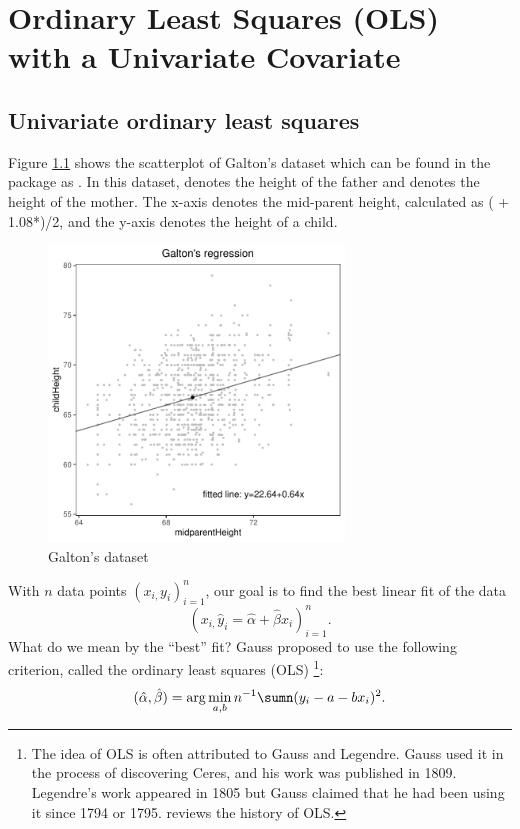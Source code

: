  
\chapter{Ordinary Least Squares (OLS) with a Univariate Covariate}
 \label{chapter::ols-1d}

\section{Univariate ordinary least squares}
Figure \ref{fig::galton_data_scatterplot} shows the scatterplot of Galton's dataset which can be found in the  package  as . In this dataset,  denotes the height of the father and  denotes the height of the mother. 
 The x-axis denotes the mid-parent height, calculated as ( + 1.08*)/2, and the y-axis denotes the height of a child. 



\begin{figure}[ht]
\centering
\includegraphics[width= 0.7\textwidth]{figures/galton_data_ggplot.pdf}
\caption{Galton's dataset}\label{fig::galton_data_scatterplot}
\end{figure}


With $n$ data points $(x_{i,}y_{i})_{i=1}^{n}$, our goal is to find the best linear fit of the data
\[
(x_{i,}\hat{y}_{i}=\hat{\alpha}+\hat{\beta}x_{i})_{i=1}^{n}.
\]
What do we mean by the ``best'' fit? Gauss proposed to use the following
criterion, called the ordinary least squares (OLS) \footnote{The idea of OLS is often attributed to Gauss and Legendre. Gauss used it in the process of discovering Ceres, and his work was published in 1809. Legendre's work appeared in 1805 but Gauss claimed that he had been using it since 1794 or 1795. \citet{stigler1981gauss} reviews the history of OLS.}:
\[
(\hat{\alpha},\hat{\beta})=\arg\min_{a,b}n^{-1}\sumn(y_{i}-a-b x_{i})^{2}.
\]


